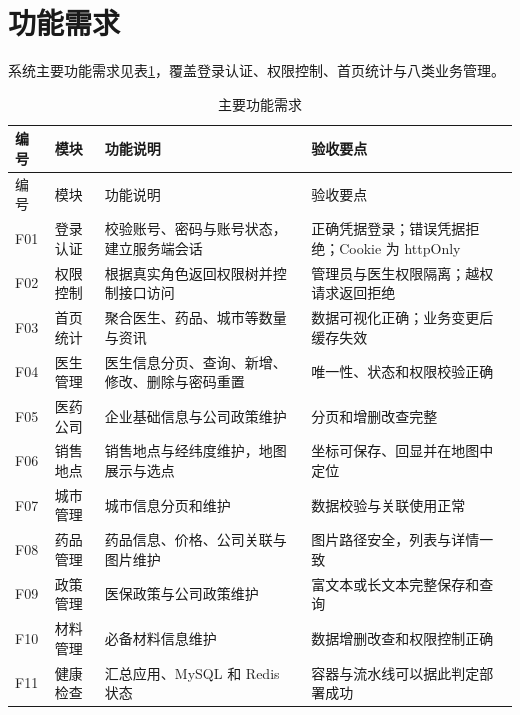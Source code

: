 \documentclass[UTF8,a4paper,12pt,openany,fontset=windows]{ctexrep}
\begin{document}
\section{功能需求}
系统主要功能需求见表\ref{tab:fr}，覆盖登录认证、权限控制、首页统计与八类业务管理。

\begin{longtable}{p{1.4cm}p{3.1cm}p{4.6cm}p{4.6cm}}
  \caption{主要功能需求}\label{tab:fr}\\
  \toprule
  编号 & 模块 & 功能说明 & 验收要点 \\
  \midrule
  \endfirsthead
  \toprule
  编号 & 模块 & 功能说明 & 验收要点 \\
  \midrule
  \endhead
  F01 & 登录认证 & 校验账号、密码与账号状态，建立服务端会话 & 正确凭据登录；错误凭据拒绝；Cookie 为 httpOnly \\
  F02 & 权限控制 & 根据真实角色返回权限树并控制接口访问 & 管理员与医生权限隔离；越权请求返回拒绝 \\
  F03 & 首页统计 & 聚合医生、药品、城市等数量与资讯 & 数据可视化正确；业务变更后缓存失效 \\
  F04 & 医生管理 & 医生信息分页、查询、新增、修改、删除与密码重置 & 唯一性、状态和权限校验正确 \\
  F05 & 医药公司 & 企业基础信息与公司政策维护 & 分页和增删改查完整 \\
  F06 & 销售地点 & 销售地点与经纬度维护，地图展示与选点 & 坐标可保存、回显并在地图中定位 \\
  F07 & 城市管理 & 城市信息分页和维护 & 数据校验与关联使用正常 \\
  F08 & 药品管理 & 药品信息、价格、公司关联与图片维护 & 图片路径安全，列表与详情一致 \\
  F09 & 政策管理 & 医保政策与公司政策维护 & 富文本或长文本完整保存和查询 \\
  F10 & 材料管理 & 必备材料信息维护 & 数据增删改查和权限控制正确 \\
  F11 & 健康检查 & 汇总应用、MySQL 和 Redis 状态 & 容器与流水线可以据此判定部署成功 \\
  \bottomrule
\end{longtable}
\end{document}
